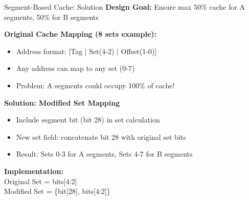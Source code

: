 \documentclass[aspectratio=169,12pt]{beamer}
\begin{document}
\begin{frame}{Segment-Based Cache: Solution}
\textbf{Design Goal:} Ensure max 50\% cache for A segments, 50\% for B segments

\pause
\textbf{Original Cache Mapping (8 sets example):}
\begin{itemize}
    \item Address format: [Tag | Set(4-2) | Offset(1-0)]
    \item Any address can map to any set (0-7)
    \item Problem: A segments could occupy 100\% of cache!
\end{itemize}

\pause
\textbf{Solution: Modified Set Mapping}
\begin{itemize}
    \item Include segment bit (bit 28) in set calculation
    \item New set field: concatenate bit 28 with original set bits
    \item Result: Sets 0-3 for A segments, Sets 4-7 for B segments
\end{itemize}

\pause
\begin{center}
\begin{tcolorbox}[colback=yellow!10, width=0.9\textwidth]
\textbf{Implementation:}\\
Original Set = bits[4:2]\\
Modified Set = \{bit[28], bits[4:2]\}
\end{tcolorbox}
\end{center}
\end{frame}
\end{document}
